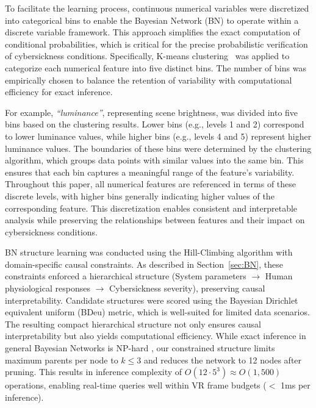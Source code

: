 \documentclass{vgtc}                          %
\begin{document}
To facilitate the learning process, continuous numerical variables were discretized into categorical bins to enable the Bayesian Network (BN) to operate within a discrete variable framework. This approach simplifies the exact computation of conditional probabilities, which is critical for the precise probabilistic verification of cybersickness conditions. Specifically, K-means clustering~\cite{scikit-learn} was applied to categorize each numerical feature into five distinct bins. The number of bins was empirically chosen to balance the retention of variability with computational efficiency for exact inference.

For example, \textit{``luminance''}, representing scene brightness, was divided into five bins based on the clustering results. Lower bins (e.g., levels 1 and 2) correspond to lower luminance values, while higher bins (e.g., levels 4 and 5) represent higher luminance values. The boundaries of these bins were determined by the clustering algorithm, which groups data points with similar values into the same bin. This ensures that each bin captures a meaningful range of the feature's variability.
%
Throughout this paper, all numerical features are referenced in terms of these discrete levels, with higher bins generally indicating higher values of the corresponding feature. This discretization enables consistent and interpretable analysis while preserving the relationships between features and their impact on cybersickness conditions.

BN structure learning was conducted using the Hill-Climbing algorithm with domain-specific causal constraints. As described in Section~\ref{sec:BN}, these constraints enforced a hierarchical structure (System parameters $\rightarrow$ Human physiological responses $\rightarrow$ Cybersickness severity),
preserving causal interpretability. Candidate structures were scored using the Bayesian Dirichlet equivalent uniform (BDeu) metric\cite{Carvalho2009ScoringFF}, which is well-suited for limited data scenarios.
The resulting compact hierarchical structure not only ensures causal interpretability but also yields computational efficiency. While exact inference in general Bayesian Networks is NP-hard \cite{kjaerulff1994reduction}, our constrained structure limits maximum parents per node to $k \leq 3$ and reduces the network to 12 nodes after pruning. This results in inference complexity of $O(12\cdot5^3) \approx  O(1,500)$ operations, enabling real-time queries well within VR frame budgets ($
<$ 1ms per inference).
\end{document}

